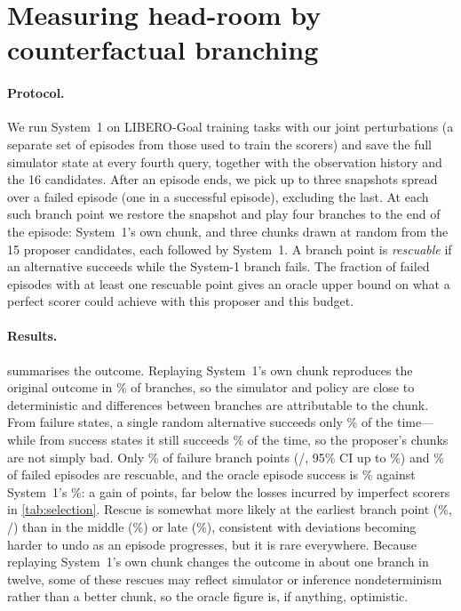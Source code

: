 \documentclass[11pt]{article}
\begin{document}
\section{Measuring head-room by counterfactual branching}
\label{sec:headroom}

\paragraph{Protocol.} We run System~1 on LIBERO-Goal training tasks with our joint perturbations (a separate set of episodes from those used to train the scorers) and save the full simulator state at every fourth query, together with the observation history and the 16 candidates. After an episode ends, we pick up to three snapshots spread over a failed episode (one in a successful episode), excluding the last. At each such branch point we restore the snapshot and play four branches to the end of the episode: System~1's own chunk, and three chunks drawn at random from the 15 proposer candidates, each followed by System~1. A branch point is \emph{rescuable} if an alternative succeeds while the System-1 branch fails. The fraction of failed episodes with at least one rescuable point gives an oracle upper bound on what a perfect scorer could achieve with this proposer and this budget.

\paragraph{Results.}  summarises the outcome. Replaying System~1's own chunk reproduces the original outcome in \repro\% of branches, so the simulator and policy are close to deterministic and differences between branches are attributable to the chunk. From failure states, a single random alternative succeeds only \altFail\% of the time---while from success states it still succeeds \altSucc\% of the time, so the proposer's chunks are not simply bad. Only \rescPts\% of failure branch points (\rescPtsK/\rescPtsN, 95\% CI up to \rescPtsHi\%) and \rescEps\% of failed episodes are rescuable, and the oracle episode success is \oracle\% against System~1's \sOneSucc\%: a gain of \oracleGain{} points, far below the losses incurred by imperfect scorers in \cref{tab:selection}. Rescue is somewhat more likely at the earliest branch point (\posEarly\%, \posEarlyK/\posEarlyN) than in the middle (\posMiddle\%) or late (\posLate\%), consistent with deviations becoming harder to undo as an episode progresses, but it is rare everywhere. Because replaying System~1's own chunk changes the outcome in about one branch in twelve, some of these rescues may reflect simulator or inference nondeterminism rather than a better chunk, so the oracle figure is, if anything, optimistic.
\end{document}
